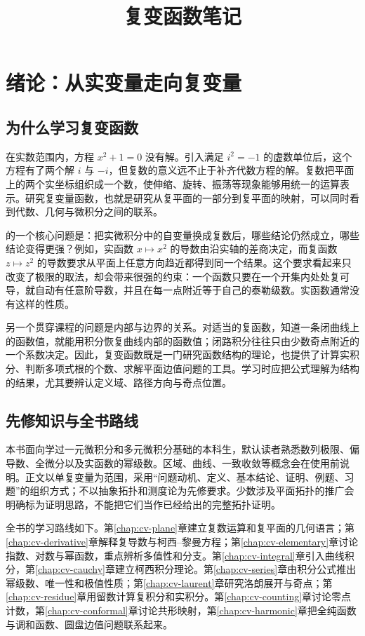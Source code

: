\documentclass[UTF8,12pt,a4paper,fontset=fandol]{ctexbook}
\title{复变函数笔记}
\author{}
\date{}
\begin{document}
\maketitle
\tableofcontents

\chapter{绪论：从实变量走向复变量}
\label{chap:cv-intro}

\section{为什么学习复变函数}

在实数范围内，方程 $x^2+1=0$ 没有解。引入满足 $i^2=-1$ 的虚数单位后，这个方程有了两个解 $i$ 与 $-i$，但复数的意义远不止于补齐代数方程的解。复数把平面上的两个实坐标组织成一个数，使伸缩、旋转、振荡等现象能够用统一的运算表示。研究复变量函数，也就是研究从复平面的一部分到复平面的映射，可以同时看到代数、几何与微积分之间的联系。

的一个核心问题是：把实微积分中的自变量换成复数后，哪些结论仍然成立，哪些结论变得更强？例如，实函数 $x\mapsto x^2$ 的导数由沿实轴的差商决定，而复函数 $z\mapsto z^2$ 的导数要求从平面上任意方向趋近都得到同一个结果。这个要求看起来只改变了极限的取法，却会带来很强的约束：一个函数只要在一个开集内处处复可导，就自动有任意阶导数，并且在每一点附近等于自己的泰勒级数。实函数通常没有这样的性质。

另一个贯穿课程的问题是内部与边界的关系。对适当的复函数，知道一条闭曲线上的函数值，就能用积分恢复曲线内部的函数值；闭路积分往往只由少数奇点附近的一个系数决定。因此，复变函数既是一门研究函数结构的理论，也提供了计算实积分、判断多项式根的个数、求解平面边值问题的工具。学习时应把公式理解为结构的结果，尤其要辨认定义域、路径方向与奇点位置。

\section{先修知识与全书路线}

本书面向学过一元微积分和多元微积分基础的本科生，默认读者熟悉数列极限、偏导数、全微分以及实函数的幂级数。区域、曲线、一致收敛等概念会在使用前说明。正文以单复变量为范围，采用“问题动机、定义、基本结论、证明、例题、习题”的组织方式；不以抽象拓扑和测度论为先修要求。少数涉及平面拓扑的推广会明确标为证明思路，不能把它们当作已经给出的完整拓扑证明。

全书的学习路线如下。第\ref{chap:cv-plane}章建立复数运算和复平面的几何语言；第\ref{chap:cv-derivative}章解释复导数与柯西--黎曼方程；第\ref{chap:cv-elementary}章讨论指数、对数与幂函数，重点辨析多值性和分支。第\ref{chap:cv-integral}章引入曲线积分，第\ref{chap:cv-cauchy}章建立柯西积分理论。第\ref{chap:cv-series}章由积分公式推出幂级数、唯一性和极值性质；第\ref{chap:cv-laurent}章研究洛朗展开与奇点；第\ref{chap:cv-residue}章用留数计算复积分和实积分。第\ref{chap:cv-counting}章讨论零点计数，第\ref{chap:cv-conformal}章讨论共形映射，第\ref{chap:cv-harmonic}章把全纯函数与调和函数、圆盘边值问题联系起来。
\end{document}
